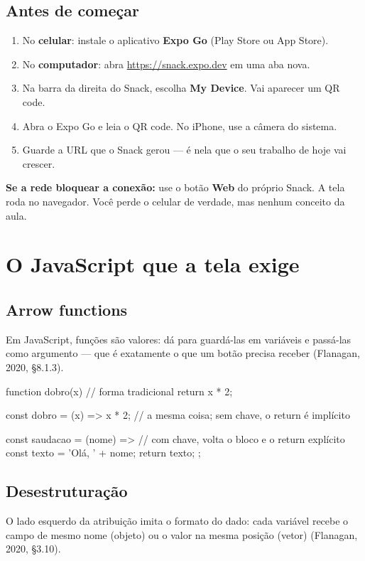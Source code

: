 \documentclass[11pt,a4paper]{article}
\begin{document}
\subsection{Antes de começar}
\begin{enumerate}
  \item No \textbf{celular}: instale o aplicativo \textbf{Expo Go} (Play Store ou App Store).
  \item No \textbf{computador}: abra \url{https://snack.expo.dev} em uma aba nova.
  \item Na barra da direita do Snack, escolha \textbf{My Device}. Vai aparecer um QR code.
  \item Abra o Expo Go e leia o QR code. No iPhone, use a câmera do sistema.
  \item Guarde a URL que o Snack gerou --- é nela que o seu trabalho de hoje vai crescer.
\end{enumerate}

\begin{aviso}
\textbf{Se a rede bloquear a conexão:} use o botão \textbf{Web} do próprio Snack. A tela
roda no navegador. Você perde o celular de verdade, mas nenhum conceito da aula.
\end{aviso}

\section{O JavaScript que a tela exige}

\subsection{Arrow functions}
Em JavaScript, funções são valores: dá para guardá-las em variáveis e passá-las
como argumento --- que é exatamente o que um botão precisa receber
(Flanagan, 2020, §8.1.3).

\begin{codigo}
function dobro(x) {            // forma tradicional
  return x * 2;
}

const dobro = (x) => x * 2;    // a mesma coisa; sem chave, o return é implícito

const saudacao = (nome) => {   // com chave, volta o bloco e o return explícito
  const texto = 'Olá, ' + nome;
  return texto;
};
\end{codigo}

\subsection{Desestruturação}
O lado esquerdo da atribuição imita o formato do dado: cada variável recebe o campo de
mesmo nome (objeto) ou o valor na mesma posição (vetor) (Flanagan, 2020, §3.10).
\end{document}
